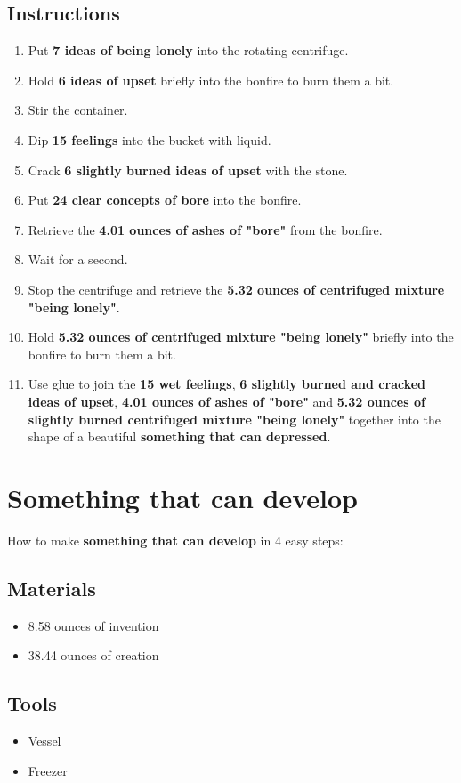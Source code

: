\documentclass{article}
\begin{document}
\subsection{Instructions}\begin{enumerate}
\item 
Put \textbf{7 ideas of being lonely} into the rotating centrifuge.
\item 
Hold \textbf{6 ideas of upset} briefly into the bonfire to burn them a bit.
\item 
Stir the container.
\item 
Dip \textbf{15 feelings} into the bucket with liquid.
\item 
Crack \textbf{6 slightly burned ideas of upset} with the stone.
\item 
Put \textbf{24 clear concepts of bore} into the bonfire.
\item 
Retrieve the \textbf{4.01 ounces of ashes of "bore"} from the bonfire.
\item 
Wait for a second.
\item 
Stop the centrifuge and retrieve the \textbf{5.32 ounces of centrifuged mixture "being lonely"}.
\item 
Hold \textbf{5.32 ounces of centrifuged mixture "being lonely"} briefly into the bonfire to burn them a bit.
\item 
Use glue to join the \textbf{15 wet feelings}, \textbf{6 slightly burned and cracked ideas of upset}, \textbf{4.01 ounces of ashes of "bore"} and \textbf{5.32 ounces of slightly burned centrifuged mixture "being lonely"} together into the shape of a beautiful \textbf{something that can depressed}.
\end{enumerate}
\newpage
\section{Something that can develop}How to make \textbf{something that can develop} in 4 easy steps:

\subsection{Materials}\begin{itemize}
\item 
8.58 ounces of invention
\item 
38.44 ounces of creation
\end{itemize}
\subsection{Tools}\begin{itemize}
\item 
Vessel
\item 
Freezer
\end{itemize}
\end{document}
